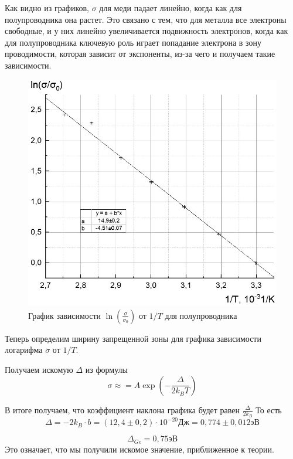 \documentclass[a4paper, 12pt]{article}%
\begin{document}
Как видно из графиков, $\sigma$ для меди падает линейно, когда как для полупроводника она растет. Это связано с тем, что для металла все электроны свободные, и у них линейно увеличивается подвижность электронов, когда как для полупроводника ключевую роль играет попадание электрона в зону проводимости, которая зависит от экспоненты, из-за чего и получаем такие зависимости.
\newpage
\begin{figure}[h]
\begin{center}
\includegraphics[width = \textwidth]{4}
\caption{График зависимости $\ln\left(\frac{\sigma}{\sigma_0}\right)$ от $1/T$ для полупроводника}
\end{center}
\end{figure}

Теперь определим ширину запрещенной зоны для графика зависимости логарифма $\sigma$ от $1/T$. 

Получаем искомую $\Delta$ из формулы 
\[\sigma \approx = A \exp\left(-\frac{\Delta}{2 k_B T}\right)\]

В итоге получаем, что коэффициент наклона графика будет равен $\frac{\Delta}{2 k_B}$
То есть 
\[\Delta = -2 k_B \cdot b = \left(12,4 \pm 0,2\right) \cdot 10^{-20} \text{Дж} = 0,774 \pm 0,012 \text{эВ}\]

\[\Delta_{Ge} = 0,75 \text{эВ}\]
Это означает, что мы получили искомое значение, приближенное к теории.
\end{document}
